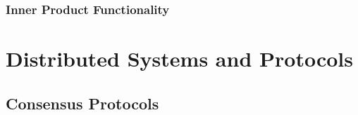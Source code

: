 	\section{Inner Product Functionality}
	
	
	

\part{Distributed Systems and Protocols}
\chapter{Consensus Protocols}
	





\appendix



